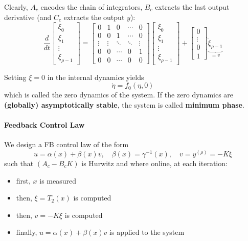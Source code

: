 Clearly, $A_c$ encodes the chain of integrators, $B_c$ extracts the last output derivative (and $C_c$ extracts the output $y$):
\begin{equation*}
    \frac{d}{dt}\begin{bmatrix}
        \xi_0  \\
        \xi_1  \\
        \vdots \\
        \xi_{\rho - 1}
    \end{bmatrix}=
    \begin{bmatrix}
        0      & 1      & 0      & \cdots & 0      \\
        0      & 0      & 1      & \cdots & 0      \\
        \vdots & \vdots & \ddots & \ddots & \vdots \\
        0      & 0      & \cdots & 0      & 1      \\
        0      & 0      & \cdots & 0      & 0
    \end{bmatrix}\begin{bmatrix}
        \xi_0  \\
        \xi_1  \\
        \vdots \\
        \xi_{\rho - 1}
    \end{bmatrix}
    +
    \begin{bmatrix}
        0      \\
        \vdots \\
        0      \\
        1
    \end{bmatrix}\underbrace{\dot{\xi}_{\rho - 1}}_{=v}
\end{equation*}

\newpar{}

Setting $\xi = 0$ in the internal dynamics yields
\begin{equation*}
    \dot{\eta} = f_0(\eta, 0)
\end{equation*}
which is called the zero dynamics of the system. If the zero dynamics are \textbf{(globally) asymptotically stable}, the system is called \textbf{minimum phase}.

\paragraph{Feedback Control Law}

We design a FB control law of the form
\begin{equation*}
    u = \alpha(x) + \beta(x)v, \quad \beta(x) = \gamma^{-1}(x), \quad v = y^{(\rho)}= -K \xi
\end{equation*}
such that $(A_c - B_c K)$ is Hurwitz and where online, at each iteration:
\begin{itemize}
    \item first, $x$ is measured
    \item then, $\xi = T_2(x)$ is computed
    \item then, $v = -K \xi$ is computed
    \item finally, $u = \alpha(x) + \beta(x)v$ is applied to the system
\end{itemize}

